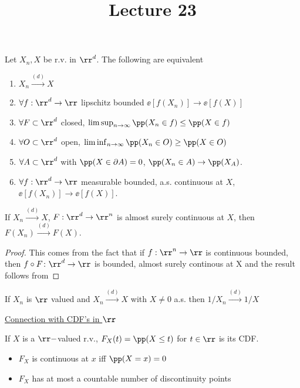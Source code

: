 \documentclass[../main.tex]{subfiles}
\title{Lecture 23}
\begin{document}
\begin{theorem*}
  Let $X_n, X$ be r.v. in $\rr^d$. The following are equivalent
  \begin{enumerate}
    \item $X_n \overset{(d)}{\longrightarrow} X$
    \item $\forall f : \rr^d \to \rr$ lipschitz bounded $\ee[f(X_n)] \overset{}{\longrightarrow} \ee[f(X)]$
    \item $\forall F \subset \rr^d$ closed, $\limsup_{n \to \infty} \pp(X_n \in
      f) \leq \pp(X \in f)$
    \item $\forall O \subset \rr^d$ open, $\liminf_{n \to \infty} \pp(X_n \in
      O) \geq \pp(X \in O)$
    \item $\forall A \subset \rr^d$ with $\pp(X \in \partial A) = 0$, $\pp(X_n
      \in A) \to \pp(X_A)$.
    \item   $\forall f: \rr^d \to \rr$ measurable bounded, a.s. continuous at 
      $X$, $\ee[f(X_n)] \longrightarrow \ee[f(X)]$.
  \end{enumerate}
\end{theorem*}
\begin{corollary}
  If $X_n \overset{(d)}{\longrightarrow} X$, $F : \rr^d \to \rr^n$ is almost
  surely continuous at $X$, then $F(X_n) \overset{(d)}{\longrightarrow} F(X)$.
\end{corollary}
\begin{proof}
    This comes from the fact that if $f : \rr^n \to \rr$ is continuous bounded,
    then $f \circ F \colon \rr^d \to \rr$ is bounded, almost surely continous at
    X and the result follows from 
\end{proof}

\begin{example}
  If $X_n$ is $\rr$ valued and $X_n \overset{(d)}{\longrightarrow} X$ with $X
  \neq 0$ a.s. then $1/X_n \overset{(d)}{\longrightarrow} 1/X$
\end{example}

\vspace{0.4em}
\noindent
\underline{\sffamily Connection with CDF's in $\rr$}

\vspace{0.4em}
\noindent
If $X$ is a $\rr-$valued r.v., $F_X(t) = \pp(X \leq t)$ for $t \in \rr$ is its
CDF.

\begin{itemize}
  \item $F_X$ is continuous at $x$ iff $\pp(X=x) = 0$
  \item $F_X$ has at most a countable number of discontinuity points
\end{itemize}
\end{document}
